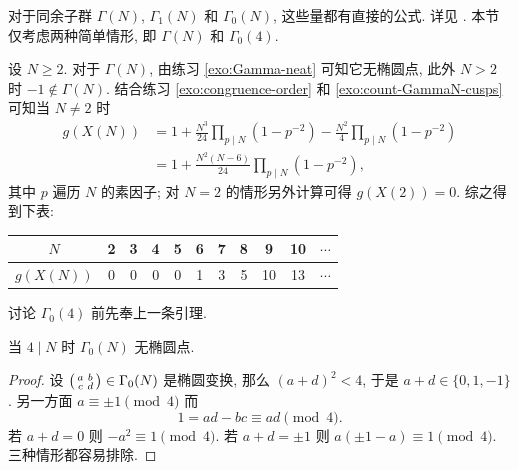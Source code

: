 对于同余子群 $\Gamma(N)$, $\Gamma_1(N)$ 和 $\Gamma_0(N)$, 这些量都有直接的公式. 详见 \cite[\S 3.7, \S 3.8]{DS05}. 本节仅考虑两种简单情形, 即 $\Gamma(N)$ 和 $\Gamma_0(4)$. 

\begin{example}\label{eg:GammaN-genus}
	设 $N \geq 2$. 对于 $\Gamma(N)$, 由练习 \ref{exo:Gamma-neat} 可知它无椭圆点, 此外 $N > 2$ 时 $-1 \notin \Gamma(N)$. 结合练习 \ref{exo:congruence-order} 和 \ref{exo:count-GammaN-cusps} 可知当 $N \neq 2$ 时
	\begin{align*}
		g(X(N)) & = 1 + \frac{N^3}{24} \prod_{p \mid N} \left( 1 - p^{-2} \right) - \frac{N^2}{4} \prod_{p \mid N} \left( 1 - p^{-2} \right) \\
		& = 1 + \frac{N^2 (N - 6)}{24} \prod_{p \mid N} \left( 1 - p^{-2} \right),
	\end{align*}
	其中 $p$ 遍历 $N$ 的素因子; 对 $N = 2$ 的情形另外计算可得 $g(X(2)) = 0$. 综之得到下表:
	\begin{center}\begin{tabular}{c|c|c|c|c|c|c|c|c|c|c}
		$N$ & 2 & 3 & 4 & 5 & 6 & 7 & 8 & 9 & 10 & $\cdots$ \\ \hline
		$g(X(N))$ & 0 & 0 & 0 & 0 & 1 & 3 & 5 & 10 & 13 & $\cdots$
	\end{tabular}\end{center}
\end{example}

讨论 $\Gamma_0(4)$ 前先奉上一条引理.
\begin{lemma}\label{prop:Gamma04-elliptic}
	当 $4 \mid N$ 时 $\Gamma_0(N)$ 无椭圆点.
\end{lemma}
\begin{proof}
	设 $\bigl(\begin{smallmatrix} a & b \\ c & d \end{smallmatrix}\bigr) \in \Gamma_0(N)$ 是椭圆变换, 那么 $(a + d)^2 < 4$, 于是 $a + d \in \{0, 1, -1\}$. 另一方面 $a \equiv \pm 1 \pmod 4$ 而
	\[ 1 = ad - bc \equiv ad \pmod 4. \]
	若 $a + d = 0$ 则 $-a^2 \equiv 1 \pmod 4$. 若 $a + d = \pm 1$ 则 $a(\pm 1 - a) \equiv 1 \pmod 4$. 三种情形都容易排除.
\end{proof}

